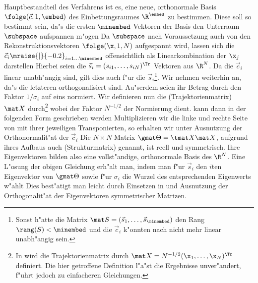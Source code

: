 Hauptbestandteil des Verfahrens ist es, eine neue, orthonormale Basis $\folge(\vec
c,1,\embed)$ des Einbettungsraumes $\R^\embed$ zu bestimmen. Diese soll so bestimmt sein,
da"s die ersten $\minembed$ Vektoren der Basis den Unterraum $\subspace$ aufspannen m"ogen
 Da $\subspace$ nach
Voraussetzung auch von den Rekonstruktionsvektoren $\folge(\x,1,N)$ aufgespannt wird,
lassen sich die $\vec c_i\mraise{\rvert}{-0.2}_{i=1\dots\minembed}$ offensichtlich als
Linearkombination der $\x_j$ darstellen  Hierbei seien die $\vec s_i = (s_{i1},\dots,s_{iN})^\Tr$
Vektoren aus $\R^N$. Da die $\vec c_i$ linear unabh"angig sind, gilt dies auch f"ur die
$\vec s_i$\footnote{Sonst h"atte die Matrix $\mat S=(\vec s_1,\dots,\vec s_\minembed)$ den
  Rang $\rang(S)<\minembed$ und die $\vec c_i$ k"onnten nach  nicht mehr
  linear unabh"angig sein.}. Wir nehmen weiterhin an, da"s die letzteren orthogonalisiert
sind. Au"serdem seien ihr Betrag durch den Faktor $1/\sigma_i$ auf eins normiert.  Wir
definieren nun die \begriff(Trajektorienmatrix) $\mat X$ durch\footnote{In
  \cite{broomhead-king} wird die Trajektorienmatrix durch $\mat X = N^{-1/2}(\x_1, \dots,
  \x_N)^\Tr$ definiert. Die hier getroffene Definition l"a"st die Ergebnisse unver"andert,
  f"uhrt jedoch zu einfacheren Gleichungen.}  
wobei der Faktor $N^{-1/2}$ der Normierung dient.   kann dann in der
folgenden Form geschrieben werden 
Multiplizieren wir die linke und rechte Seite von  mit ihrer jeweiligen
Transponierten, so erhalten wir unter Ausnutzung der Orthonormalit"at der $\vec c_i$
Die $N\times N$ Matrix $\gmat \Theta = \tmat X \mat X$, aufgrund ihres Aufbaus auch
\begriff(Strukturmatrix) genannt, ist reell und symmetrisch. Ihre
Eigenvektoren bilden also eine vollst"andige, orthonormale Basis des $\R^N$. 
Eine L"osung der obigen Gleichung erh"alt man, indem man f"ur $\vec s_i$ 
den $i$ten Eigenvektor von $\gmat \Theta$ sowie f"ur $\sigma_i$ die Wurzel des entsprechenden Eigenwerts w"ahlt
Dies best"atigt man leicht durch Einsetzen in  und Ausnutzung der Orthogonalit"at der
Eigenvektoren symmetrischer Matrizen. 


